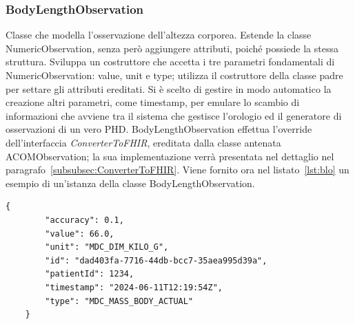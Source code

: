\documentclass[a4paper]{article}
\begin{document}
\subsubsection*{BodyLengthObservation}
Classe che modella l'osservazione dell'altezza corporea.
Estende la classe NumericObservation, senza però aggiungere attributi, poiché possiede la stessa struttura.
Sviluppa un costruttore che accetta i tre parametri fondamentali di NumericObservation: value, unit e type; utilizza il costruttore della classe padre per settare gli attributi ereditati.
Si è scelto di gestire in modo automatico la creazione altri parametri, come timestamp, per emulare lo scambio di informazioni che avviene tra il sistema che gestisce l'orologio ed il generatore di osservazioni di un vero PHD.
BodyLengthObservation effettua l'override dell'interfaccia \textit{ConverterToFHIR}, ereditata dalla classe antenata ACOMObservation; la sua implementazione verrà presentata nel dettaglio nel paragrafo~\ref{subsubsec:ConverterToFHIR}.
Viene fornito ora nel listato~\ref{lst:blo} un esempio di un'istanza della classe BodyLengthObservation.
\begin{lstlisting}[caption={Esempio istanza di BodyLengthObservation},label={lst:blo}]
    {
        "accuracy": 0.1,
        "value": 66.0,
        "unit": "MDC_DIM_KILO_G",
        "id": "dad403fa-7716-44db-bcc7-35aea995d39a",
        "patientId": 1234,
        "timestamp": "2024-06-11T12:19:54Z",
        "type": "MDC_MASS_BODY_ACTUAL"
    }
\end{lstlisting}
\end{document}
